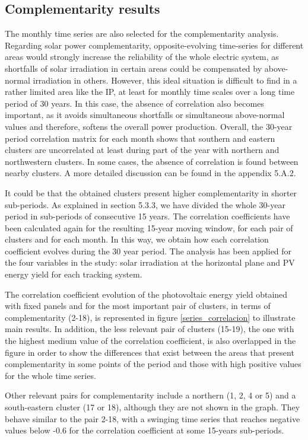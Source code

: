 \subsection{Complementarity results}

The monthly time series are also selected for the complementarity analysis.
Regarding solar power complementarity, opposite-evolving time-series for different areas would strongly increase the reliability of the whole electric system, as shortfalls of solar irradiation in certain areas could be compensated by above-normal irradiation in others. However, this ideal situation is difficult to find in a rather limited area like the IP, at least for monthly time scales over a long time period of 30 years. In this case, the absence of correlation also becomes important, as it avoids simultaneous shortfalls or simultaneous above-normal values and therefore, softens the overall power production. Overall, the 30-year period correlation matrix for each month shows that southern and eastern clusters are uncorrelated at least during part of the year with northern and northwestern clusters. In some cases, the absence of correlation is found between nearby clusters. A more detailed discussion can be found in the appendix 5.A.2.

It could be that the obtained clusters present higher complementarity in shorter sub-periods. As explained in section 5.3.3, we have divided the whole 30-year period in sub-periods of consecutive 15 years. The correlation coefficients have been calculated again for the resulting 15-year moving window, for each pair of clusters and for each month. In this way, we obtain how each correlation coefficient evolves during the 30 year period. The analysis has been applied for the four variables in the study: solar irradiation at the horizontal plane and PV energy yield for each tracking system.

The correlation coefficient evolution of the photovoltaic energy yield obtained with fixed panels and for the most important pair of clusters, in terms of complementarity (2-18), is represented in figure \ref{series_correlacion} to illustrate main results. In addition, the less relevant pair of clusters (15-19), the one with the highest medium value of the correlation coefficient, is also overlapped in the figure in order to show the differences that exist between the areas that present complementarity in some points of the period and those with high positive values for the whole time series.

Other relevant pairs for complementarity include a northern (1, 2, 4 or 5) and a south-eastern cluster (17 or 18),  although they are not shown in the graph. They behave similar to the pair 2-18, with a swinging time series that reaches negative values below -0.6 for the correlation coefficient at some 15-years sub-periods. 

